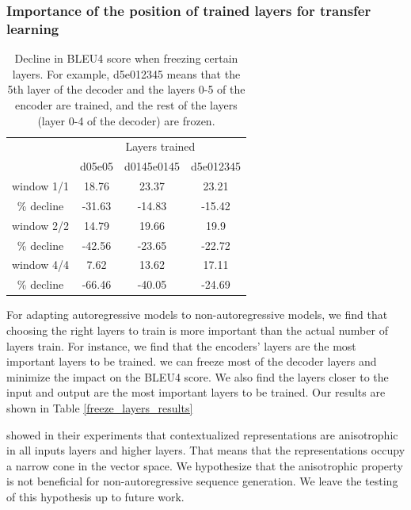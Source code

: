 \subsubsection{Importance of the position of trained layers for transfer learning}

\begin{table}[]
\centering
\begin{tabular}{c|c|c|c|}
\cline{2-4}
\multicolumn{1}{l|}{}            & \multicolumn{3}{c|}{Layers trained} \\ \cline{2-4} 
                                 & d05e05   & d0145e0145  & d5e012345  \\ \hline
\multicolumn{1}{|c|}{window 1/1} & 18.76    & 23.37       & 23.21      \\
\multicolumn{1}{|c|}{\% decline} & -31.63   & -14.83      & -15.42     \\ \hline
\multicolumn{1}{|c|}{window 2/2} & 14.79    & 19.66       & 19.9       \\
\multicolumn{1}{|c|}{\% decline} & -42.56   & -23.65      & -22.72     \\ \hline
\multicolumn{1}{|c|}{window 4/4} & 7.62     & 13.62       & 17.11      \\
\multicolumn{1}{|c|}{\% decline} & -66.46   & -40.05      & -24.69     \\ \hline
\end{tabular}
\caption{Decline in BLEU4 score when freezing certain layers. For example, d5e012345 means that the 5th layer of the decoder and the layers 0-5 of the encoder are trained, and the rest of the layers (layer 0-4 of the decoder) are frozen.}
\label{tab:freeze_layers_results}
\end{table}


For adapting autoregressive models to non-autoregressive models, we find that choosing the right layers to train is more important than the actual number of layers train. For instance, we find that the encoders' layers are the most important layers to be trained. we can freeze most of the decoder layers and minimize the impact on the BLEU4 score. We also find the layers closer to the input and output are the most important layers to be trained. Our results are shown in Table \ref{freeze_layers_results}

\textcite{ethayarajh-2019-contextual_ani} showed in their experiments that contextualized representations are anisotrophic in all inputs layers and higher layers. That means that the representations occupy a narrow cone in the vector space. We hypothesize that the anisotrophic property is not beneficial for non-autoregressive sequence generation. We leave the testing of this hypothesis up to future work.